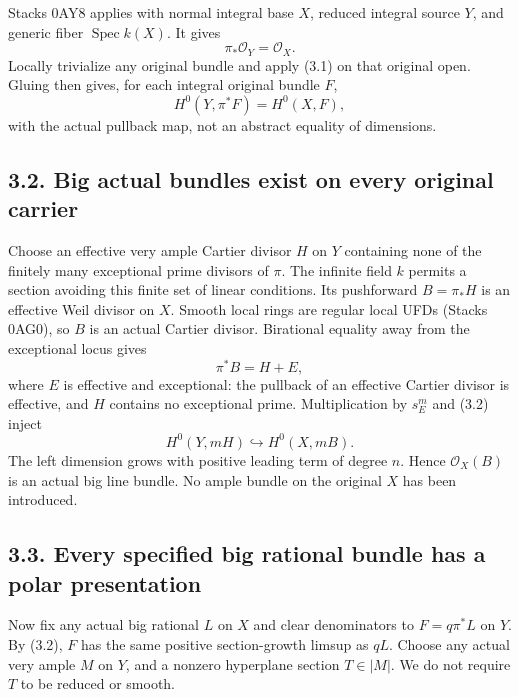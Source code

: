 \documentclass[
  10pt,
]{article}
\begin{document}
Stacks 0AY8 applies with normal integral base \(X\), reduced integral
source \(Y\), and generic fiber \(\operatorname{Spec}k(X)\). It gives
\[\pi_*\mathcal O_Y=\mathcal O_X.                         \tag{3.1}\]
Locally trivialize any original bundle and apply (3.1) on that original
open. Gluing then gives, for each integral original bundle \(F\),
\[H^0(Y,\pi^*F)=H^0(X,F),                              \tag{3.2}\] with
the actual pullback map, not an abstract equality of dimensions.

\subsection{3.2. Big actual bundles exist on every original
carrier}\label{big-actual-bundles-exist-on-every-original-carrier}

Choose an effective very ample Cartier divisor \(H\) on \(Y\) containing
none of the finitely many exceptional prime divisors of \(\pi\). The
infinite field \(k\) permits a section avoiding this finite set of
linear conditions. Its pushforward \(B=\pi_*H\) is an effective Weil
divisor on \(X\). Smooth local rings are regular local UFDs (Stacks
0AG0), so \(B\) is an actual Cartier divisor. Birational equality away
from the exceptional locus gives \[\pi^*B=H+E,\] where \(E\) is
effective and exceptional: the pullback of an effective Cartier divisor
is effective, and \(H\) contains no exceptional prime. Multiplication by
\(s_E^m\) and (3.2) inject \[H^0(Y,mH)\hookrightarrow H^0(X,mB).\] The
left dimension grows with positive leading term of degree \(n\). Hence
\(\mathcal O_X(B)\) is an actual big line bundle. No ample bundle on the
original \(X\) has been introduced.

\subsection{3.3. Every specified big rational bundle has a polar
presentation}\label{every-specified-big-rational-bundle-has-a-polar-presentation}

Now fix any actual big rational \(L\) on \(X\) and clear denominators to
\(F=q\pi^*L\) on \(Y\). By (3.2), \(F\) has the same positive
section-growth limsup as \(qL\). Choose any actual very ample \(M\) on
\(Y\), and a nonzero hyperplane section \(T\in|M|\). We do not require
\(T\) to be reduced or smooth.
\end{document}
